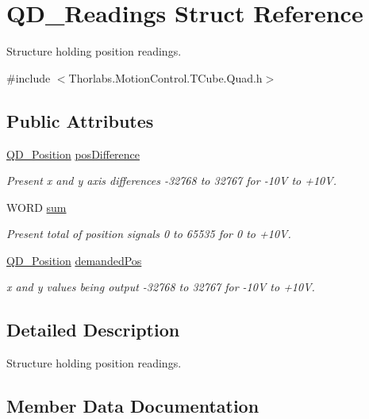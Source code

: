 \hypertarget{struct_q_d___readings}{}\section{Q\+D\+\_\+\+Readings Struct Reference}
\label{struct_q_d___readings}


Structure holding position readings.  




{\ttfamily \#include $<$Thorlabs.\+Motion\+Control.\+T\+Cube.\+Quad.\+h$>$}

\subsection*{Public Attributes}
\begin{DoxyCompactItemize}
\item 
\hyperlink{struct_q_d___position}{Q\+D\+\_\+\+Position} \hyperlink{struct_q_d___readings_a5c5a9ed7dc0c42a91975b01c3af69251}{pos\+Difference}
\begin{DoxyCompactList}\small\item\em Present x and y axis differences -\/32768 to 32767 for -\/10V to +10V. \end{DoxyCompactList}\item 
W\+O\+RD \hyperlink{struct_q_d___readings_a34808338cc3bc115499929c70cf7081d}{sum}
\begin{DoxyCompactList}\small\item\em Present total of position signals 0 to 65535 for 0 to +10V. \end{DoxyCompactList}\item 
\hyperlink{struct_q_d___position}{Q\+D\+\_\+\+Position} \hyperlink{struct_q_d___readings_a6079ed031a93b1132466001608c6bd28}{demanded\+Pos}
\begin{DoxyCompactList}\small\item\em x and y values being output -\/32768 to 32767 for -\/10V to +10V. \end{DoxyCompactList}\end{DoxyCompactItemize}


\subsection{Detailed Description}
Structure holding position readings. 



\subsection{Member Data Documentation}
